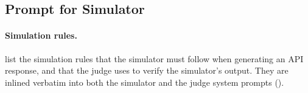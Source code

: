 %
%


\subsection{Prompt for Simulator}
\label{sec:simulator-prompt}
\paragraph{Simulation rules.}
 list the simulation rules that the simulator must follow when generating an API response, and that the judge uses to verify the simulator's output. They are inlined verbatim into both the simulator and the judge system prompts ().

